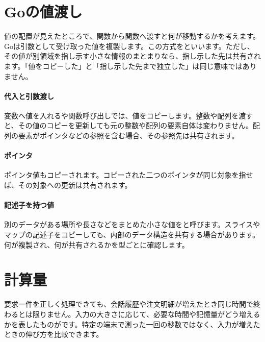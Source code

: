 \section{Goの値渡し}
\label{sec:03-runtime-data-10}

値の配置が見えたところで、関数から関数へ渡すと何が移動するかを考えます。Goは引数として受け取った値を複製します。この方式をといいます。ただし、その値が別領域を指し示す小さな情報のまとまりなら、指し示した先は共有されます。「値をコピーした」と「指し示した先まで独立した」は同じ意味ではありません。

\begingroup
\begingroup
\paragraph{代入と引数渡し}
        変数へ値を入れるや関数呼び出しでは、値をコピーします。整数や配列を渡すと、その値のコピーを更新しても元の整数や配列の要素自体は変わりません。配列の要素がポインタなどの参照を含む場合、その参照先は共有されます。

\paragraph{ポインタ}
        ポインタ値もコピーされます。コピーされた二つのポインタが同じ対象を指せば、その対象への更新は共有されます。

\par
\endgroup
\medskip
\begingroup
      \centering
      \vspace{3mm}
\paragraph{記述子を持つ値}
        別のデータがある場所や長さなどをまとめた小さな値をと呼びます。スライスやマップの記述子をコピーしても、内部のデータ構造を共有する場合があります。何が複製され、何が共有されるかを型ごとに確認します。

\par
\endgroup
\par
\endgroup


\section{計算量}
\label{sec:03-runtime-data-11}

要求一件を正しく処理できても、会話履歴や注文明細が増えたとき同じ時間で終わるとは限りません。入力の大きさに応じて、必要な時間や記憶量がどう増えるかを表したものがです。特定の端末で測った一回の秒数ではなく、入力が増えたときの伸び方を比較できます。

